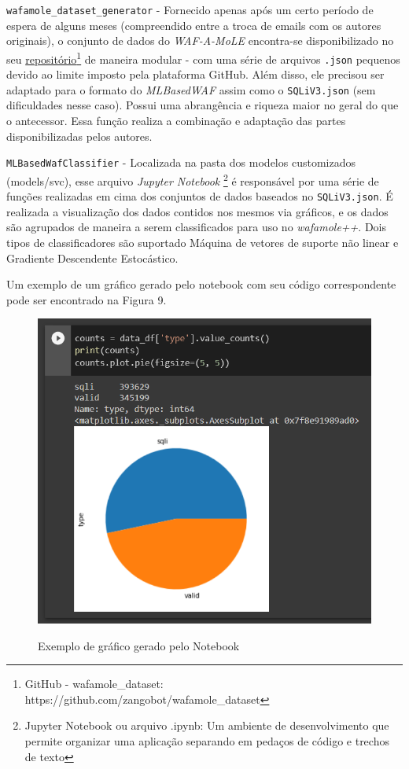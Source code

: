 \begin{alineas}
\begin{alineas}
\item \verb+wafamole_dataset_generator+ - Fornecido apenas após um certo período de espera de alguns meses (compreendido entre a troca de emails com os autores originais), o conjunto de dados do \textit{WAF-A-MoLE} encontra-se disponibilizado no seu \href{https://github.com/zangobot/wafamole_dataset}{repositório}\footnote{GitHub - wafamole\_dataset: https://github.com/zangobot/wafamole_dataset} de maneira modular - com uma série de arquivos \verb+.json+ pequenos devido ao limite imposto pela plataforma GitHub. Além disso, ele precisou ser adaptado para o formato do \textit{MLBasedWAF} assim como o \verb+SQLiV3.json+ (sem dificuldades nesse caso). Possui uma abrangência e riqueza maior no geral do que o antecessor. Essa função realiza a combinação e adaptação das partes disponibilizadas pelos autores.

\end{alineas}
\item \verb+MLBasedWafClassifier+ - Localizada na pasta dos modelos customizados (models/svc), esse arquivo \textit{Jupyter Notebook} \footnote{Jupyter Notebook ou arquivo .ipynb: Um ambiente de desenvolvimento que permite organizar uma aplicação separando em pedaços de código e trechos de texto} é responsável por uma série de funções realizadas em cima dos conjuntos de dados baseados no \verb+SQLiV3.json+. É realizada a visualização dos dados contidos nos mesmos via gráficos, e os dados são agrupados de maneira a serem classificados para uso no \textit{wafamole++}. Dois tipos de classificadores são suportado Máquina de vetores de suporte não linear e Gradiente Descendente Estocástico. 

Um exemplo de um gráfico gerado pelo notebook com seu código correspondente pode ser encontrado na Figura 9.

\begin{figure}[ht]
    \centering
    \caption{Exemplo de gráfico gerado pelo Notebook}
    \includegraphics[width=16cm]{figuras/exemplo_grafico_notebook.png} 
    \label{fig:internet} 
\end{figure}


\end{alineas}

